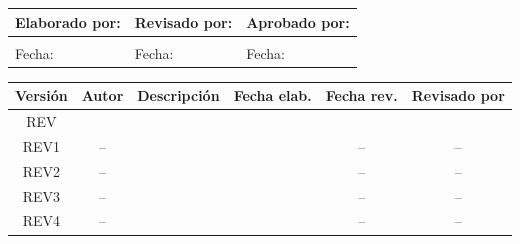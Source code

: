 \begin{titlepage}
	\thispagestyle{corporativo}

	\vspace*{1.5cm}

	\centering
	{\Large\bfseries \projecttitle}

	\vspace{4cm}



	\centering
	\fontsize{10}{12}\selectfont
	\renewcommand{\arraystretch}{1.3}
	\setlength{\tabcolsep}{3pt}

	\begin{tabular}{|p{}|p{}|p{}|}
		\hline
		\rowcolor{green!15}
		\textbf{Elaborado por:} & \textbf{Revisado por:} & \textbf{Aprobado por:} \\
		\hline
		\centering\arraybackslash\rule{0pt}{1.5cm} \firmaElaboro & \centering\arraybackslash\rule{0pt}{1.5cm} \firmaReviso & \centering\arraybackslash\rule{0pt}{1.5cm} \firmaAprobo \\
		\hline
		\centering\arraybackslash Fecha: \fechaElaboro & \centering\arraybackslash Fecha: \fechaReviso & \centering\arraybackslash Fecha: \fechaAprobo \\
		\hline
	\end{tabular}

	\vspace{2.5cm}

	\centering
	\fontsize{10}{12}\selectfont
	\renewcommand{\arraystretch}{1.2}
	\setlength{\tabcolsep}{3pt}

	\begin{tabular}{|c|c|p{}|c|c|c|}
		\hline
		\rowcolor{green!15}
		\textbf{Versión} & \textbf{Autor} & \textbf{Descripción} & \textbf{Fecha elab.} & \textbf{Fecha rev.} & \textbf{Revisado por} \\
		\hline
		REV\docRevision & \firmaElaboro & \descRevCero & \fechaElaboro & \fechaReviso & \firmaReviso \\
		\hline
		REV1 & -- & \descRevUno & \fechaRevUno & -- & -- \\
		\hline
		REV2 & -- & \descRevDos & \fechaRevDos & -- & -- \\
		\hline
		REV3 & -- & \descRevTres & \fechaRevTres & -- & -- \\
		\hline
		REV4 & -- & \descRevCuatro & \fechaRevCuatro & -- & -- \\
		\hline
	\end{tabular}

	\vfill

\end{titlepage}
